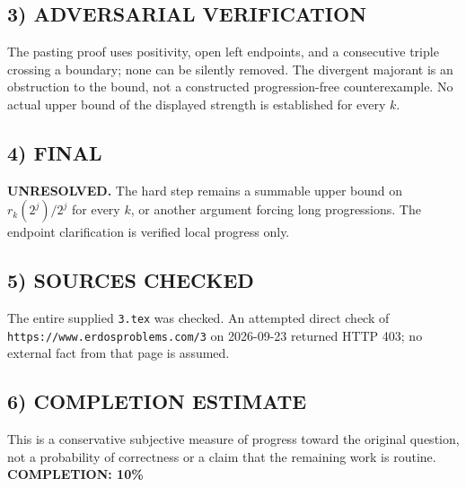 \subsection{3) ADVERSARIAL VERIFICATION}
The pasting proof uses positivity, open left endpoints, and a consecutive triple crossing a boundary; none can be silently removed. The divergent majorant is an obstruction to the bound, not a constructed progression-free counterexample. No actual upper bound of the displayed strength is established for every $k$.
\subsection{4) FINAL}
\textbf{UNRESOLVED.}
The hard step remains a summable upper bound on $r_k(2^j)/2^j$ for every $k$, or another argument forcing long progressions. The endpoint clarification is verified local progress only.
\subsection{5) SOURCES CHECKED}
The entire supplied \texttt{3.tex} was checked. An attempted direct check of \texttt{https://www.erdosproblems.com/3} on 2026-09-23 returned HTTP 403; no external fact from that page is assumed.
\subsection{6) COMPLETION ESTIMATE}
This is a conservative subjective measure of progress toward the original question, not a probability of correctness or a claim that the remaining work is routine.
\textbf{COMPLETION: 10\%}
